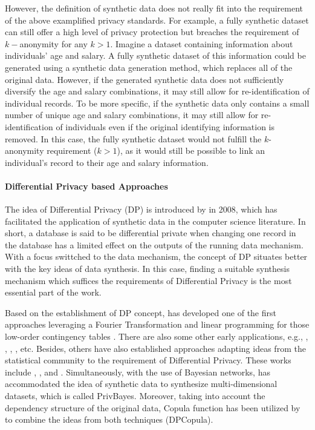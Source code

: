 However, the definition of synthetic data does not really fit into the requirement of the above examplified privacy standards. For example, a fully synthetic dataset can still offer a high level of privacy protection but breaches the requirement of $k-$anonymity for any $k>1$. Imagine a dataset containing information about individuals' age and salary. A fully synthetic dataset of this information could be generated using a synthetic data generation method, which replaces all of the original data. However, if the generated synthetic data does not sufficiently diversify the age and salary combinations, it may still allow for re-identification of individual records. To be more specific, if the synthetic data only contains a small number of unique age and salary combinations, it may still allow for re-identification of individuals even if the original identifying information is removed. In this case, the fully synthetic dataset would not fulfill the $k$-anonymity requirement ($k>1$), as it would still be possible to link an individual's record to their age and salary information.

\paragraph{Differential Privacy based Approaches}
The idea of Differential Privacy (DP) is introduced by \citet{dwork2008differential} in 2008, which has facilitated the application of
synthetic data in the computer science literature. In short, a database is said to be differential private when changing one
record in the database has a limited effect on the outputs of the running data mechanism. With a focus swittched to the data mechanism, 
the concept of DP situates better with the key ideas of data synthesis. In this case, finding a suitable synthesis mechanism which suffices
the requirements of Differential Privacy is the most essential part of the work. 


Based on the establishment of DP concept, \citet{barak2007privacy} has developed one of the first approaches leveraging a Fourier Transformation
and linear programming for those low-order contingency tables \citep{dwork2008differential}. There are also some other early applications, e.g., \citep{eno2008generating},
\citep{cano2010evaluation}, \citep{blum2013learning}, \citep{xiao2010differential}, etc. Besides, others have also established approaches adapting
ideas from the statistical community to the requirement of Differential Privacy. These works include \citep{abowd2008protective}, 
\citep{machanavajjhala2008privacy}, \citep{charest2011can} and \citep{mcclure2012differential}. Simultaneously, with the use of Bayesian networks, 
\citep{zhang2017privbayes} has accommodated the idea of synthetic data to synthesize multi-dimensional datasets, which is called PrivBayes. Moreover,
taking into account the dependency structure of the original data, Copula function has been utilized by \citet{li2014differentially} to combine the ideas from both techniques (DPCopula).

